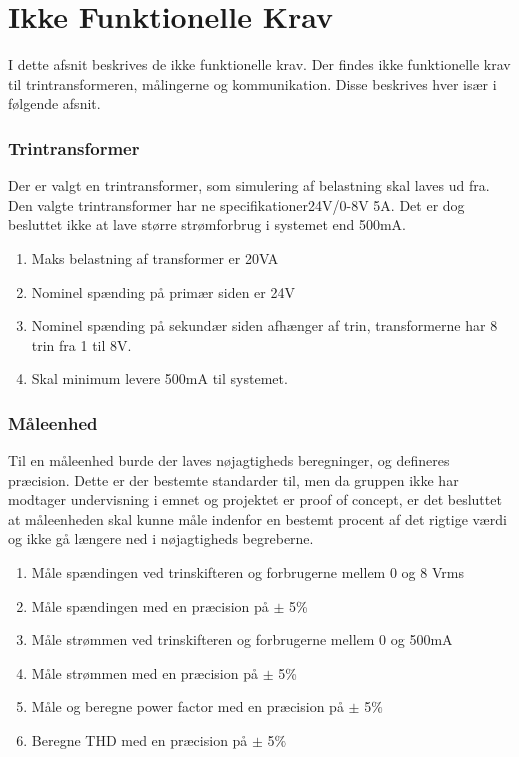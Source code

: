 
\section{Ikke Funktionelle Krav}
I dette afsnit beskrives de ikke funktionelle krav. Der findes ikke funktionelle krav til trintransformeren, målingerne og kommunikation. Disse beskrives hver især i følgende afsnit.

\subsubsection{Trintransformer}
Der er valgt en trintransformer, som simulering af belastning skal laves ud fra. Den valgte trintransformer har ne specifikationer24V/0-8V 5A. Det er dog besluttet ikke at lave større strømforbrug i systemet end 500mA. 

\begin{enumerate}
	\item Maks belastning af transformer er 20VA
	\item Nominel spænding på primær siden er 24V
	\item Nominel spænding på sekundær siden afhænger af trin, transformerne har 8 trin fra 1 til 8V.
	\item Skal minimum levere 500mA til systemet. 
\end{enumerate}

\subsubsection{Måleenhed}
Til en måleenhed burde der laves nøjagtigheds beregninger, og defineres præcision. Dette er der bestemte standarder til, men da gruppen ikke har modtager undervisning i emnet og projektet er proof of concept, er det besluttet at måleenheden skal kunne måle indenfor en bestemt procent af det rigtige værdi og ikke gå længere ned i nøjagtigheds begreberne.

\begin{enumerate}
	\item Måle spændingen ved trinskifteren og forbrugerne mellem 0 og 8 Vrms
	\item Måle spændingen med en præcision på $\pm$ 5\%
	\item Måle strømmen ved trinskifteren og forbrugerne mellem 0 og 500mA
	\item Måle strømmen med en præcision på $\pm$ 5\%
	\item Måle og beregne power factor med en præcision på $\pm$ 5$\%$
	\item Beregne THD med en præcision på $\pm$ 5$\%$
\end{enumerate} 

